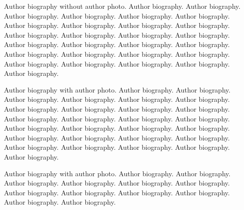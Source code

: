 \documentclass[a4paper,fleqn]{cas-sc}
\begin{document}
\vskip6pc         %

Author biography without author photo.
Author biography. Author biography. Author biography.
Author biography. Author biography. Author biography.
Author biography. Author biography. Author biography.
Author biography. Author biography. Author biography.
Author biography. Author biography. Author biography.
Author biography. Author biography. Author biography.
Author biography. Author biography. Author biography.
Author biography. Author biography. Author biography.
Author biography. Author biography. Author biography.
\endbio

\vskip3pc         %

Author biography with author photo.
Author biography. Author biography. Author biography.
Author biography. Author biography. Author biography.
Author biography. Author biography. Author biography.
Author biography. Author biography. Author biography.
Author biography. Author biography. Author biography.
Author biography. Author biography. Author biography.
Author biography. Author biography. Author biography.
Author biography. Author biography. Author biography.
Author biography. Author biography. Author biography.
\endbio

\vskip3pc         %

Author biography with author photo.
Author biography. Author biography. Author biography.
Author biography. Author biography. Author biography.
Author biography. Author biography. Author biography.
Author biography. Author biography. Author biography.
\endbio
\end{document}
